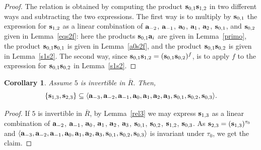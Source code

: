 \documentclass[a4paper]{amsart}
\newtheorem{cor}[lemma]{Corollary}
\newcommand{\Ro}{{\overline R}}
\newcommand{\ba}{{\bf a}}
\newcommand{\bs}{{\bf s}}
\begin{document}
\begin{proof}
The relation is obtained by computing the product $\bs_{0,1} \bs_{1,2}$ in two different ways and subtracting the two expressions. The first way is to multiply by $\bs_{0,1}$ the expression for $\bs_{1,2}$ as a linear combination of $\ba_{-2}$, $\ba_{-1}$, $\ba_0$, $\ba_1$, $\ba_2$, $\bs_{0,1}$, and $\bs_{0,2}$ given in Lemma~\ref{eqs2f}: here the products $\bs_{0,1}\ba_i$ are given in Lemma~\ref{primo}, the product $\bs_{0,1}\bs_{0,1}$ is given in Lemma~\ref{a0s2f}, and the product $\bs_{0,1} \bs_{0,2}$ is given in Lemma~\ref{s1s2}. The second way, since $\bs_{0,1}\bs_{1,2}=(\bs_{0,1}\bs_{0,2})^f$, is to apply $f$ to the 
expression for $\bs_{0,1}\bs_{0,2}$ in Lemma~\ref{s1s2}. 
\end{proof}

\begin{cor}\label{ch5}
Assume $5$ is invertible in $\Ro$. Then,
$$
\{\bs_{1,3}, \bs_{2,3}\} \subseteq \langle \ba_{-3}, \ba_{-2}, \ba_{-1}, \ba_{0}, \ba_{1}, \ba_{2}, \ba_{3}, \bs_{0,1}, \bs_{0,2}, \bs_{0,3}\rangle .
$$
\end{cor}
\begin{proof}
If $5$ is invertible in $\Ro$, by Lemma~\ref{rel3} we may express $\bs_{1,3}$ as a linear combination of $\ba_{-2}$, $\ba_{-1}$, $\ba_{0}$, $\ba_{1}$, $\ba_{2}$, $\ba_{3}$, $\bs_{0,1}$, $\bs_{0,2}$, $\bs_{1,2}$, $\bs_{0,3}$. As $\bs_{2,3}=(\bs_{1,3})^{\tau_0} $ and $\langle \ba_{-3}, \ba_{-2}, \ba_{-1}, \ba_{0}, \ba_{1}, \ba_{2}, \ba_{3}, \bs_{0,1}, \bs_{0,2}, \bs_{0,3}\rangle$ is invariant under $\tau_0$, we get the claim. 
\end{proof}
\end{document}
